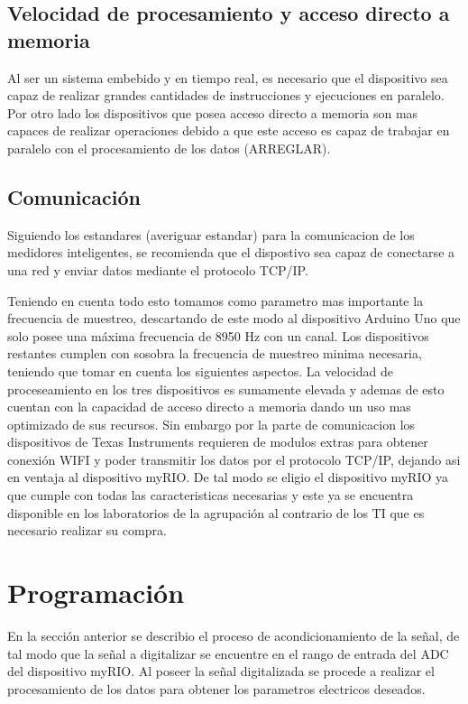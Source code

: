   \subsection{Velocidad de procesamiento y acceso directo a memoria}
  \par Al ser un sistema embebido y en tiempo real, es necesario que el dispositivo
  sea capaz de realizar grandes cantidades de instrucciones y ejecuciones en paralelo.
  Por otro lado los dispositivos que posea acceso directo a memoria son mas capaces de
  realizar operaciones debido a que este acceso es capaz de trabajar en paralelo con
  el procesamiento de los datos (ARREGLAR).

  \subsection{Comunicación}
  \par Siguiendo los estandares (averiguar estandar) para la comunicacion de los
  medidores inteligentes, se recomienda que el dispostivo sea capaz de conectarse a una
  red y enviar datos mediante el protocolo TCP/IP. \\

  \par Teniendo en cuenta todo esto tomamos como parametro mas importante la frecuencia de
  muestreo, descartando de este modo al dispositivo Arduino Uno que solo posee una
  máxima frecuencia de 8950 Hz con un canal. Los dispositivos restantes cumplen con
  sosobra la frecuencia de muestreo minima necesaria, teniendo que tomar en cuenta los
  siguientes aspectos. La velocidad de proceseamiento en los tres dispositivos es
  sumamente elevada y ademas de esto cuentan con la capacidad de acceso directo a
  memoria dando un uso mas optimizado de sus recursos. Sin embargo por la parte de
  comunicacion los dispositivos de Texas Instruments requieren de modulos extras
  para obtener conexión WIFI y poder transmitir los datos por el protocolo TCP/IP,
  dejando asi en ventaja al dispositivo myRIO. De tal modo se eligio el dispositivo
  myRIO ya que cumple con todas las caracteristicas necesarias y este ya se encuentra
  disponible en los laboratorios de la agrupación al contrario de los TI que es necesario
  realizar su compra.

\section{Programación}
  \par En la sección anterior se describio el proceso de acondicionamiento de la señal, de tal modo que la señal a digitalizar se encuentre en el rango de entrada del ADC del dispositivo myRIO. Al poseer la señal digitalizada se procede a realizar el procesamiento de los datos para obtener los parametros electricos deseados.

